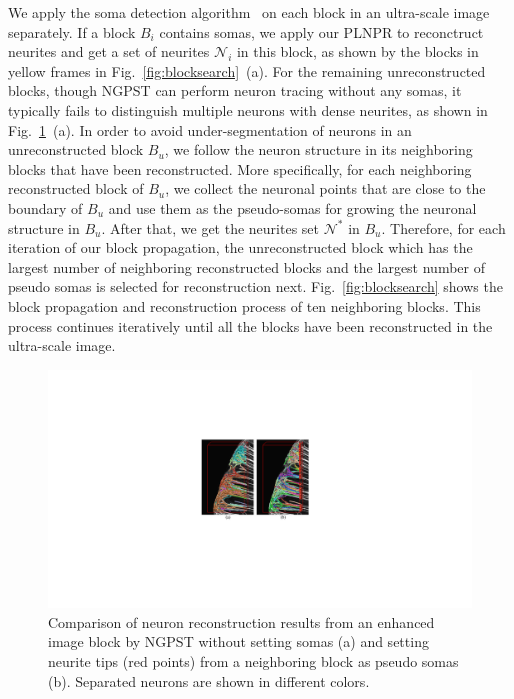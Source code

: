  
We apply the soma detection algorithm~\cite{Quan2013} on each block in an ultra-scale image separately. 
If a block $B_{i}$ contains somas, we apply our PLNPR to reconctruct neurites and get a set of neurites $\mathcal{N}_{i}$ in this block, as shown by the blocks in yellow frames in Fig.~\ref{fig:blocksearch}~(a).
%
For the remaining unreconstructed blocks, though NGPST can perform neuron tracing without any somas, it typically fails to distinguish multiple neurons with dense neurites, as shown in Fig.~\ref{fig:ngpst_pseudosoma}~(a).
%
In order to avoid under-segmentation of neurons in an unreconstructed block $B_u$, we follow the neuron structure in its neighboring blocks that have been reconstructed.
%
More specifically, for each neighboring reconstructed block of $B_u$, we collect the neuronal points that are close to the boundary of $B_u$ and use them as the pseudo-somas for growing the neuronal structure in $B_u$. After that, we get the neurites set $ \mathcal{N}^*$ in $B_u$.
%
Therefore, for each iteration of our block propagation, the unreconstructed block which has the largest number of neighboring reconstructed blocks and the largest number of pseudo somas is selected for reconstruction next.
%
Fig.~\ref{fig:blocksearch} shows the block propagation and reconstruction process of ten neighboring blocks. 
%
This process continues iteratively until all the blocks have been reconstructed in the ultra-scale image. 
%

\begin{figure}[t]
	\centering
	\includegraphics[width=0.85\columnwidth]{./Illustrations/ngpst_pseudosoma.pdf}
	\caption{Comparison of neuron reconstruction results from an enhanced image block by NGPST without setting somas (a) and setting neurite tips (red points) from a neighboring block as pseudo somas (b). Separated neurons are shown in different colors.}
	\label{fig:ngpst_pseudosoma}
\end{figure}




